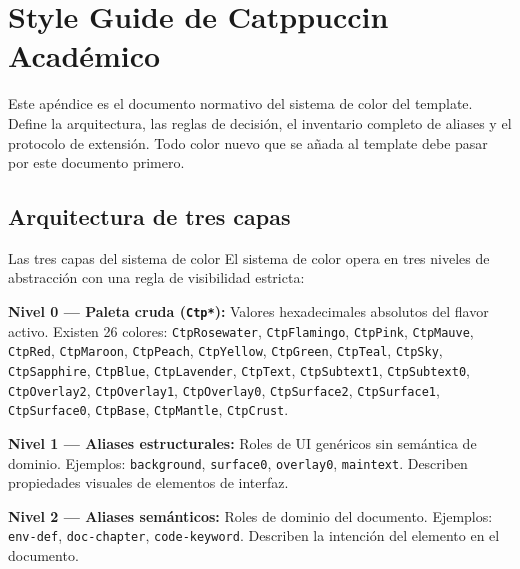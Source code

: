 \chapter{Style Guide de Catppuccin Académico}
\label{ap:styleguide}

Este apéndice es el documento normativo del sistema de color del template.
Define la arquitectura, las reglas de decisión, el inventario completo de
aliases y el protocolo de extensión. Todo color nuevo que se añada al
template debe pasar por este documento primero.

\section{Arquitectura de tres capas}
\label{ap:sec:arquitectura}

\begin{definicion}{Las tres capas del sistema de color}
\label{ap:def:tres-capas}
El sistema de color opera en tres niveles de abstracción con una regla
de visibilidad estricta:

\textbf{Nivel 0 — Paleta cruda (\texttt{Ctp*}):} Valores hexadecimales
absolutos del flavor activo. Existen 26 colores: \texttt{CtpRosewater},
\texttt{CtpFlamingo}, \texttt{CtpPink}, \texttt{CtpMauve}, \texttt{CtpRed},
\texttt{CtpMaroon}, \texttt{CtpPeach}, \texttt{CtpYellow}, \texttt{CtpGreen},
\texttt{CtpTeal}, \texttt{CtpSky}, \texttt{CtpSapphire}, \texttt{CtpBlue},
\texttt{CtpLavender}, \texttt{CtpText}, \texttt{CtpSubtext1},
\texttt{CtpSubtext0}, \texttt{CtpOverlay2}, \texttt{CtpOverlay1},
\texttt{CtpOverlay0}, \texttt{CtpSurface2}, \texttt{CtpSurface1},
\texttt{CtpSurface0}, \texttt{CtpBase}, \texttt{CtpMantle},
\texttt{CtpCrust}.

\textbf{Nivel 1 — Aliases estructurales:} Roles de UI genéricos sin
semántica de dominio. Ejemplos: \texttt{background}, \texttt{surface0},
\texttt{overlay0}, \texttt{maintext}. Describen propiedades visuales de
elementos de interfaz.

\textbf{Nivel 2 — Aliases semánticos:} Roles de dominio del documento.
Ejemplos: \texttt{env-def}, \texttt{doc-chapter}, \texttt{code-keyword}.
Describen la intención del elemento en el documento.
\end{definicion}

